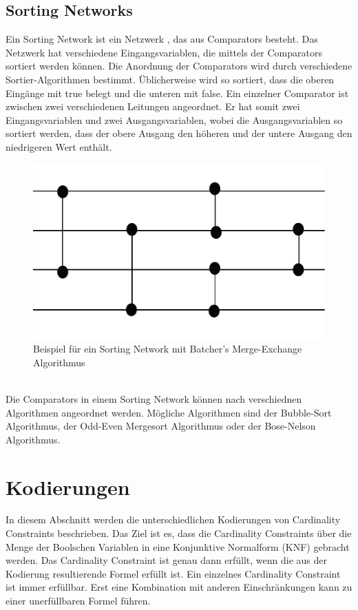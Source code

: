\documentclass[a4,abstract=on]{scrartcl}
\newcommand*\stdsection{}
\let\stdsection\section
\renewcommand*\section{%
    \clearpage\ifodd\value{page}\else\mbox{}\clearpage\fi
    \stdsection}
\begin{document}
\subsection{Sorting Networks}
Ein Sorting Network ist ein Netzwerk \cite[vgl.][]{sorting}, das aus Comparators besteht. Das Netzwerk hat verschiedene Eingangsvariablen, die mittels der Comparators sortiert werden können. Die Anordnung der Comparators wird durch verschiedene Sortier-Algorithmen bestimmt. Üblicherweise wird so sortiert, dass die oberen Eingänge mit true belegt und die unteren mit false. Ein einzelner Comparator ist zwischen zwei verschiedenen Leitungen angeordnet. Er hat somit zwei Eingangsvariablen und zwei Ausgangsvariablen, wobei die Ausgangsvariablen so sortiert werden, dass der obere Ausgang den höheren und der untere Ausgang den niedrigeren Wert enthält.

\begin{figure}[H]
\centering
\includegraphics[width=\textwidth]{sorting_network_grundlage1.pdf}
\caption{Beispiel für ein Sorting Network mit Batcher's Merge-Exchange Algorithmus}
\label{fig:network_grundlage}
\end{figure}
\ \\
Die Comparators in einem Sorting Network können nach verschiednen Algorithmen angeordnet werden. Mögliche Algorithmen sind der Bubble-Sort Algorithmus, der Odd-Even Mergesort Algorithmus oder der Bose-Nelson Algorithmus.

\section{Kodierungen}
In diesem Abschnitt werden die unterschiedlichen Kodierungen von Cardinality Constraints beschrieben. Das Ziel ist es, dass die Cardinality Constraints über die Menge der Boolschen Variablen in eine Konjunktive Normalform (KNF) gebracht werden. %
Das Cardinality Constraint ist genau dann erfüllt, wenn die aus der Kodierung resultierende Formel erfüllt ist. Ein einzelnes Cardinality Constraint ist immer erfüllbar. Erst eine Kombination mit anderen Einschränkungen kann zu einer unerfüllbaren Formel führen.
\end{document}
